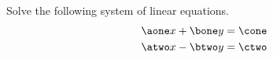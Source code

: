 









\pgfmathtruncatemacro{\money}{\lcmy/\bone}
\pgfmathtruncatemacro{\mtwoy}{\lcmy/\btwo}


\pgfmathtruncatemacro{\maone}{\money*\aone}
\pgfmathtruncatemacro{\matwo}{\mtwoy*\atwo}


\pgfmathtruncatemacro{\cone}{\aone*\x+\bone*\y}
\pgfmathtruncatemacro{\ctwo}{\atwo*\x-\btwo*\y}


\pgfmathtruncatemacro{\monecone}{\money*\cone}
\pgfmathtruncatemacro{\mtwoctwo}{\mtwoy*\ctwo}


\pgfmathtruncatemacro{\coefx}{\maone+\matwo}

\pgfmathtruncatemacro{\cthree}{\monecone+\mtwoctwo}


\pgfmathtruncatemacro{\aonetimesx}{\aone*\x}


\pgfmathtruncatemacro{\coneminusaonex}{\cone-\aone*\x}


\setcounter{equation}{0}





Solve the following system of linear equations.
\begin{align}
\aone x + \bone y &= \cone  \label{eq-I001-1}\\
\atwo x - \btwo y &= \ctwo  \label{eq-I001-2}
\end{align}

